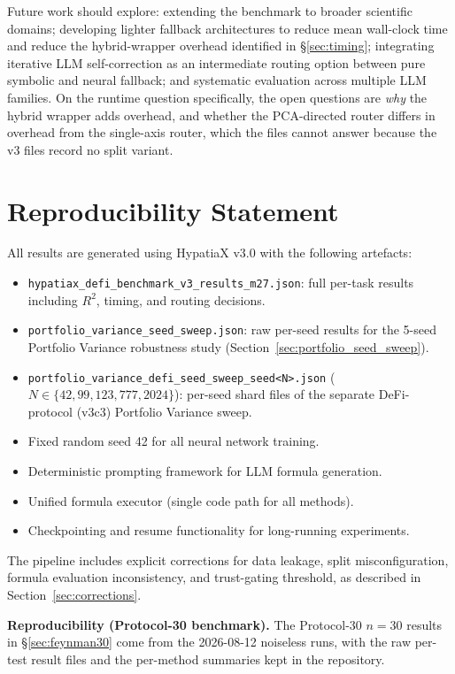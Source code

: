 \documentclass[twoside,11pt]{article}
\newcommand{\Rsq}{R^{2}}
\begin{document}
Future work should explore: extending the benchmark to broader scientific domains;
developing lighter fallback architectures to reduce mean wall-clock time and
reduce the hybrid-wrapper overhead identified in
\S\ref{sec:timing};
integrating iterative LLM self-correction as an intermediate routing option between
pure symbolic and neural fallback; and systematic evaluation across multiple LLM
families. On the runtime question specifically, the open
questions are \emph{why} the hybrid wrapper adds overhead, and whether the
PCA-directed router differs in overhead from the single-axis router, which
the files cannot answer because the v3 files record no split variant.

\section*{Reproducibility Statement}

All results are generated using HypatiaX v3.0 with the following artefacts:
\begin{itemize}
  \item \texttt{hypatiax\_defi\_benchmark\_v3\_results\_m27.json}: full per-task
    results including $\Rsq$, timing, and routing decisions.
  \item \texttt{portfolio\_variance\_seed\_sweep.json}: raw per-seed results for
    the 5-seed Portfolio Variance robustness study (Section~\ref{sec:portfolio_seed_sweep}).
  \item \texttt{portfolio\_variance\_defi\_seed\_sweep\_seed<N>.json} ($N\in\{42,99,123,777,2024\}$):
    per-seed shard files of the separate DeFi-protocol (v3c3) Portfolio Variance sweep.
  \item Fixed random seed 42 for all neural network training.
  \item Deterministic prompting framework for LLM formula generation.
  \item Unified formula executor (single code path for all methods).
  \item Checkpointing and resume functionality for long-running experiments.
\end{itemize}
The pipeline includes explicit corrections for data leakage, split misconfiguration,
formula evaluation inconsistency, and trust-gating threshold, as described in
Section~\ref{sec:corrections}.

\textbf{Reproducibility (Protocol-30 benchmark).} The Protocol-30 $n=30$ results in
\S\ref{sec:feynman30} come from the 2026-08-12 noiseless runs, with the raw
per-test result files and the per-method summaries kept in the repository.
\end{document}
